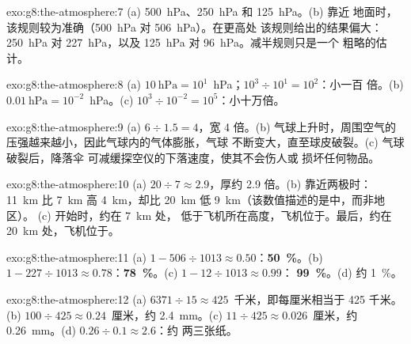\begin{solution}{exo:g8:the-atmosphere:7}
(a) \qty{500}{hPa}、\qty{250}{hPa} 和 \qty{125}{hPa}。(b) 靠近
地面时，该规则较为准确（\qty{500}{hPa} 对 \qty{506}{hPa}）。在更高处
该规则给出的结果偏大：\qty{250}{hPa} 对 \qty{227}{hPa}，以及
\qty{125}{hPa} 对 \qty{96}{hPa}。减半规则只是一个
粗略的估计。
\end{solution}

\begin{solution}{exo:g8:the-atmosphere:8}
(a) $10~\text{hPa} = 10^1$~hPa；$10^3 \div 10^1 = 10^2$：小一百
倍。(b) $0.01~\text{hPa} = 10^{-2}$~hPa。(c) $10^3 \div 10^{-2} =
10^5$：小十万倍。
\end{solution}

\begin{solution}{exo:g8:the-atmosphere:9}
(a) $6 \div 1.5 = 4$，宽 4 倍。(b) 气球上升时，周围空气的
压强越来越小，因此气球内的气体膨胀，气球
不断变大，直至球皮破裂。(c) 气球破裂后，降落伞
可减缓探空仪的下落速度，使其不会伤人或
损坏任何物品。
\end{solution}

\begin{solution}{exo:g8:the-atmosphere:10}
(a) $20 \div 7 \approx 2.9$，厚约 2.9 倍。(b) 靠近两极时：
\qty{11}{km} 比 \qty{7}{km} 高 \qty{4}{km}，却比 \qty{20}{km} 低 \qty{9}{km}（该数值描述的是中，而非地区）。
(c) 开始时，约在 \qty{7}{km} 处，
低于飞机所在高度，飞机位于。最后，约在
\qty{20}{km} 处，飞机位于。
\end{solution}

\begin{solution}{exo:g8:the-atmosphere:11}
(a) $1 - 506 \div 1013 \approx 0.50$：\textbf{50~\%}。(b) $1 - 227 \div
1013 \approx 0.78$：\textbf{78~\%}。(c) $1 - 12 \div 1013 \approx 0.99$：
\textbf{99~\%}。(d) 约 1~\%。
\end{solution}

\begin{solution}{exo:g8:the-atmosphere:12}
(a) $6371 \div 15 \approx 425$~千米，即每厘米相当于 425 千米。(b) $100 \div 425
\approx 0.24$~厘米，约 \qty{2.4}{mm}。(c) $11 \div 425 \approx
0.026$~厘米，约 \qty{0.26}{mm}。(d) $0.26 \div 0.1 \approx 2.6$：约
两三张纸。
\end{solution}


